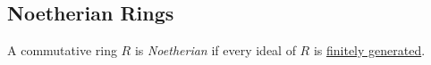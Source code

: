 \subsection{Noetherian Rings}\label{noetherian rings}
A commutative ring $R$ is \emph{Noetherian} if every ideal of $R$ is \hyperref[finitelygenerated]{finitely generated}.